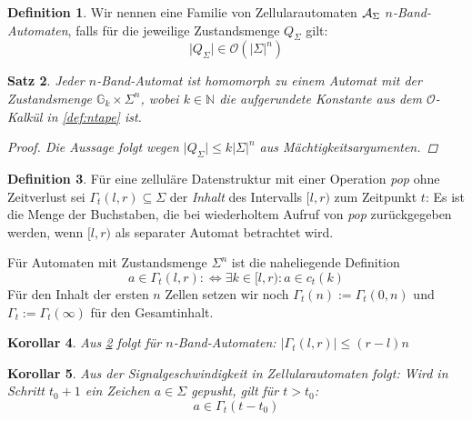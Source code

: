 \documentclass{article}
\theoremstyle{plain}%
\newtheorem{thm}{Satz}
\newtheorem{cor}[thm]{Korollar}
\theoremstyle{definition}
\newtheorem{defn}[thm]{Definition}
\theoremstyle{remark}
\begin{document}
\newcommand{\ca}{\ensuremath\mathcal{A}}
\newcommand{\abs}[1]{\lvert#1\rvert}

\begin{defn}
    Wir nennen eine Familie von Zellularautomaten $\ca_\Sigma$ \emph{$n$-Band-Automaten}, falls für die jeweilige Zustandsmenge $Q_\Sigma$ gilt:
    \begin{equation}
        \abs{Q_\Sigma} \in \mathcal{O}(\abs{\Sigma}^n) \label{def:ntape}
    \end{equation}
\end{defn}

\begin{thm}
    \label{thm:tape-hom}
    Jeder $n$-Band-Automat ist homomorph zu einem Automat mit der Zustandsmenge $\mathbb{G}_k \times \Sigma^n$, wobei $k \in \mathbb{N}$ die aufgerundete Konstante aus dem $\mathcal{O}$-Kalkül in \eqref{def:ntape} ist.

    \begin{proof}
        Die Aussage folgt wegen $\abs{Q_\Sigma} \leq k \abs{\Sigma}^n$ aus Mächtigkeitsargumenten.
    \end{proof}
\end{thm}

\begin{defn}
    Für eine zelluläre Datenstruktur mit einer Operation \emph{pop} ohne Zeitverlust sei $\Gamma_t(l,r) \subseteq \Sigma$ der \emph{Inhalt} des Intervalls $[l,r)$ zum Zeitpunkt $t$: Es ist die Menge der Buchstaben, die bei wiederholtem Aufruf von \emph{pop} zurückgegeben werden, wenn $[l,r)$ als separater Automat betrachtet wird.

    Für Automaten mit Zustandsmenge $\Sigma^n$ ist die naheliegende Definition
    \[ a \in \Gamma_t(l,r) :\Leftrightarrow \exists k \in [l,r): a \in c_t(k) \]
    Für den Inhalt der ersten $n$ Zellen setzen wir noch $\Gamma_t(n) := \Gamma_t(0,n)$ und $\Gamma_t := \Gamma_t(\infty)$ für den Gesamtinhalt.
\end{defn}

\begin{cor}
    Aus \ref{thm:tape-hom} folgt für $n$-Band-Automaten: $\abs{\Gamma_t(l,r)} \leq (r-l)n$
\end{cor}

\begin{cor}
    Aus der Signalgeschwindigkeit in Zellularautomaten folgt: Wird in Schritt $t_0+1$ ein Zeichen $a \in \Sigma$ gepusht, gilt für $t > t_0$:
    \begin{equation}
        a \in \Gamma_t(t-t_0) \label{cor:signal}
    \end{equation}
\end{cor}
\end{document}
